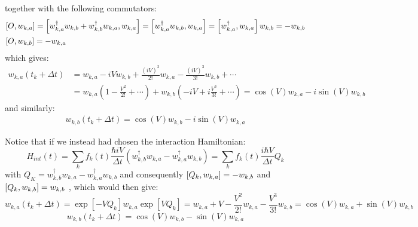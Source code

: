together with the following commutators:
\begin{align}
    &\comm{O}{w_{k,a}} = \left[w_{k, a}^\dagger w_{k, b}+w_{k, b}^{\dagger} w_{k, a}, w_{k, a}\right] = \left[w_{k, a}^{\dagger} w_{k, b}, w_{k, a}\right]=\left[w_{k, a}^\dagger, w_{k, a}\right] w_{k, b} = -w_{k, b} \\
    & \comm{O}{w_{k,b}} = -w_{k, a}
\end{align}
which gives:
\begin{align}
     w_{k,a}(t_k + \Delta t) & = w_{k,a} - i V w_{k,b} + \frac{(i V)^2}{2 !} w_{k,a}-\frac{(i V)^3}{3!} w_{k,b}+\cdots \\
    & = w_{k,a}(1 - \frac{V^2}{2!} + \cdots ) + w_{k,b}(-iV + i \frac{V^3}{3!} + \cdots ) = \cos(V) w_{k,a} -i \sin(V) w_{k,b}
\end{align}
and similarly:
\begin{align}
    w_{k,b}(t_k + \Delta t) = \cos(V) w_{k,b} -i \sin(V) w_{k,a}
\end{align}

Notice that if we instead had chosen the interaction Hamiltonian: 
\begin{equation}
     H_{int}(t) = \sum_k f_k(t) \frac{\hbar i V}{\Delta t}\left(w_{k, b}^{\dagger} w_{k, a} - w_{k, a}^{\dagger} w_{k, b}\right) = \sum_k f_k(t)\frac{i \hbar V}{\Delta t} Q_k
\end{equation}
with $Q_K =  w_{k, b}^{\dagger} w_{k, a} - w_{k, a}^{\dagger} w_{k, b}$ and consequently $\comm{Q_k}{w_{k,a}} = - w_{k,b}$ and $\comm{Q_k}{w_{k,b}} = w_{k,b}$ , which would then give:
\begin{equation}
    w_{k,a}(t_k + \Delta t) = \exp \left[- V Q_k \right]  w_{k,a} \exp \left[V Q_k \right] = w_{k,a} + V - \frac{V^2}{2!}w_{k,a} - \frac{V^3}{3!}w_{k,b} = \cos(V) w_{k,a} + \sin(V) w_{k,b}   
\end{equation}
\begin{equation}
    w_{k,b}(t_k + \Delta t) =  \cos(V) w_{k,b} - \sin(V) w_{k,a}   
\end{equation}


\

